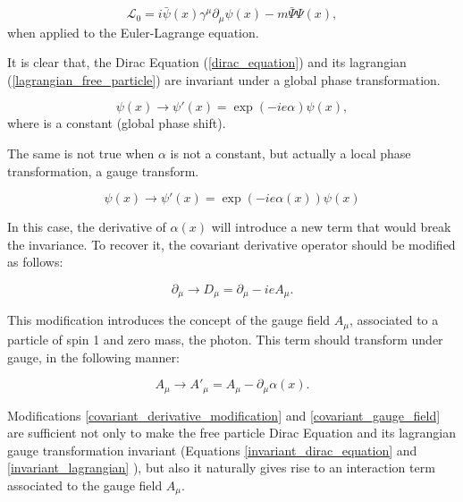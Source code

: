 \begin{equation}
    \mathcal{L_{\text{0}}} = i\bar{\psi}(x)\gamma^\mu\partial_\mu\psi(x)-m\bar{\Psi}\Psi(x),
    \label{lagrangian_free_particle}
\end{equation}
when applied to the Euler-Lagrange equation.

It is clear that, the Dirac Equation (\ref{dirac_equation}) and its lagrangian (\ref{lagrangian_free_particle}) are invariant under a global phase transformation.

\begin{equation}
    \psi(x) \rightarrow \psi'(x) = \exp{(-ie\alpha)}\psi(x),
    \label{global_phase_transformation}
\end{equation}
where is a constant (global phase shift).

The same is not true when $\alpha$ is not a constant, but actually a local phase transformation, a gauge transform.

\begin{equation}
    \psi(x) \rightarrow \psi'(x) = \exp{(-ie\alpha(x))}\psi(x)
    \label{local_phase_transformation}
\end{equation}

In this case, the derivative of $\alpha(x)$ will introduce a new term that would break the invariance. To recover it, the covariant derivative operator should be modified as follows:

\begin{equation}
    \partial_\mu \rightarrow D_\mu = \partial_\mu - ieA_\mu.
    \label{covariant_derivative_modification}
\end{equation}

This modification introduces the concept of the gauge field $A_\mu$, associated to a particle of spin 1 and zero mass, the photon. This term should transform under gauge, in the following manner:

\begin{equation}
    A_\mu \rightarrow A'_\mu = A_\mu - \partial_\mu\alpha(x).
    \label{covariant_gauge_field}
\end{equation}

Modifications \ref{covariant_derivative_modification} and \ref{covariant_gauge_field} are sufficient not only to make the free particle Dirac Equation and its lagrangian gauge transformation invariant (Equations \ref{invariant_dirac_equation} and \ref{invariant_lagrangian} ), but also it naturally gives rise to an interaction term associated to the gauge field $A_\mu$.

